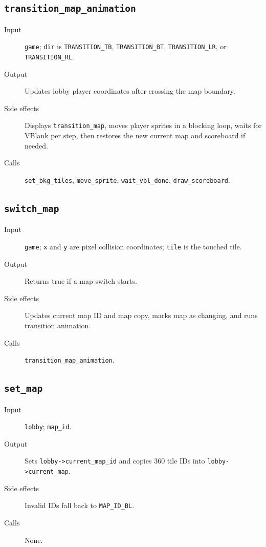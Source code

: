 \subsection*{\texttt{transition\_map\_animation}}
\begin{description}
  \item[Input] \texttt{game}; \texttt{dir} is \texttt{TRANSITION\_TB}, \texttt{TRANSITION\_BT}, \texttt{TRANSITION\_LR}, or \texttt{TRANSITION\_RL}.
  \item[Output] Updates lobby player coordinates after crossing the map boundary.
  \item[Side effects] Displays \texttt{transition\_map}, moves player sprites in a blocking loop, waits for VBlank per step, then restores the new current map and scoreboard if needed.
  \item[Calls] \texttt{set\_bkg\_tiles}, \texttt{move\_sprite}, \texttt{wait\_vbl\_done}, \texttt{draw\_scoreboard}.
\end{description}

\subsection*{\texttt{switch\_map}}
\begin{description}
  \item[Input] \texttt{game}; \texttt{x} and \texttt{y} are pixel collision coordinates; \texttt{tile} is the touched tile.
  \item[Output] Returns true if a map switch starts.
  \item[Side effects] Updates current map ID and map copy, marks map as changing, and runs transition animation.
  \item[Calls] \texttt{transition\_map\_animation}.
\end{description}

\subsection*{\texttt{set\_map}}
\begin{description}
  \item[Input] \texttt{lobby}; \texttt{map\_id}.
  \item[Output] Sets \texttt{lobby->current\_map\_id} and copies 360 tile IDs into \texttt{lobby->current\_map}.
  \item[Side effects] Invalid IDs fall back to \texttt{MAP\_ID\_BL}.
  \item[Calls] None.
\end{description}


